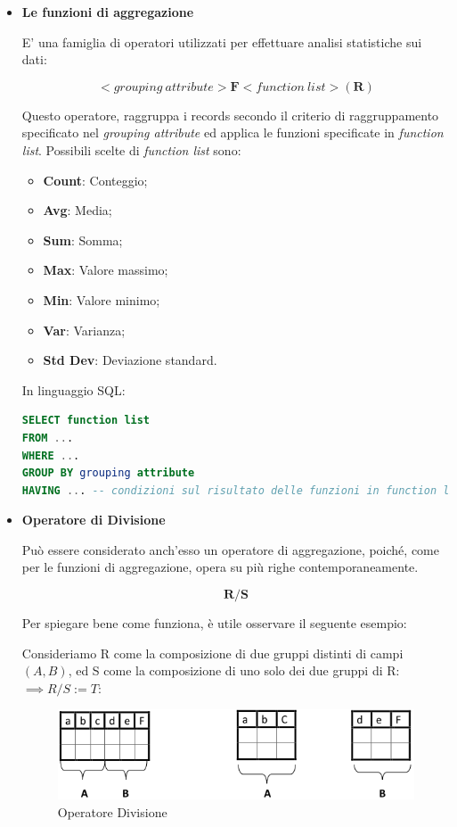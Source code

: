 \begin{itemize}

\item{\textbf{Le funzioni di aggregazione}}

E’ una famiglia di operatori utilizzati per effettuare analisi statistiche sui dati:

\[
	<grouping\ attribute>\mathbf{F}<function\ list>(\mathbf{R})
\]

Questo operatore, raggruppa i records secondo il criterio di raggruppamento specificato nel \textit{grouping attribute} ed applica le funzioni specificate in \textit{function list}. Possibili scelte di \textit{function list} sono:

\begin{itemize}

\item{\textbf{Count}}: Conteggio;
\item{\textbf{Avg}}: Media;
\item{\textbf{Sum}}: Somma;
\item{\textbf{Max}}: Valore massimo;
\item{\textbf{Min}}: Valore minimo;
\item{\textbf{Var}}: Varianza;
\item{\textbf{Std Dev}}: Deviazione standard.

\end{itemize}

In linguaggio SQL: 

\begin{lstlisting}[language=SQL]
SELECT function list
FROM ...
WHERE ...
GROUP BY grouping attribute
HAVING ... -- condizioni sul risultato delle funzioni in function list 
\end{lstlisting}

\item{\textbf{Operatore di Divisione}}

Può essere considerato anch’esso un operatore di aggregazione, poiché, come per le funzioni di aggregazione, opera su più righe contemporaneamente. 

\[
	\mathbf{R} / \mathbf{S}
\]

Per spiegare bene come funziona, è utile osservare il seguente esempio: 

Consideriamo R come la composizione di due gruppi distinti di campi $(A,B)$, ed S come la composizione di uno solo dei due gruppi di R: $\implies R/S := T$:

\begin{center}
\begin{figure}[H]
\centering
\includegraphics[scale=0.8]{figures/division.png}
\caption{Operatore Divisione} 
\end{figure}
\end{center}


\end{itemize}

